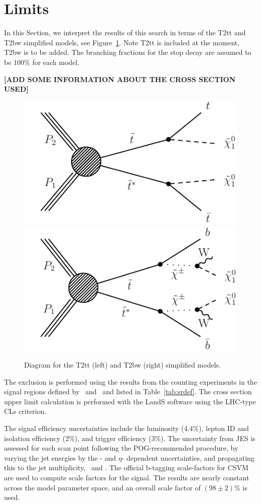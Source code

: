\section{Limits}
\label{sec:signal}

In this Section, we interpret the results of this search in terms of
the T2tt and T2bw simplified models, see Figure~\ref{fig:SigDiagram}.
Note T2tt is included at the moment, T2bw is to be added.
The branching fractions for the stop decay are assumed to be $100\%$
for each model. 

{\bf[ADD SOME INFORMATION ABOUT THE CROSS SECTION USED]}

\begin{figure}[hbt]
  \begin{center}
        \includegraphics[width=0.5\linewidth]{plots/stopPlot/T2tt.pdf}%
        \includegraphics[width=0.5\linewidth]{plots/stopPlot/T2bw.pdf}%
	\caption{Diagram for the T2tt (left) and T2bw (right)
          simplified models.}
	\label{fig:SigDiagram}
      \end{center}
\end{figure}

The exclusion is performed using the results from the counting experiments in the signal regions
defined by \met\ and \mt\ and listed in Table~\ref{tab:srdef}. 
The cross section upper limit calculation is performed with the LandS software using the LHC-type CLs criterion. 

The signal efﬁciency uncertainties include the luminosity (4.4\%), lepton ID and isolation
efﬁciency (2\%), and trigger efﬁciency (3\%). The uncertainty from JES
is assessed for each scan point following the POG-recommended
procedure, by varying the jet energies by the \pt- and $\eta$-
dependent uncertainties, and propagating this to the jet multiplicity,
\met\ and \mt. The official b-tagging scale-factors for CSVM are used to compute scale
factors for the signal. The results are nearly constant across the
model parameter space, and an overall scale factor of $(98 \pm 2)\%$
is used. 

